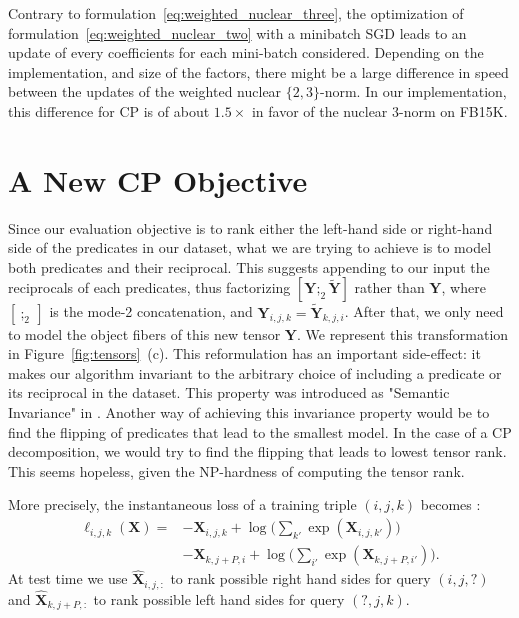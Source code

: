 \documentclass{article}
\newcommand{\tensor}[1]{{\bm #1}}
\newcommand{\CP}{{CP}\xspace}
\newcommand{\fb}{{FB15K}\xspace}
\newcommand{\tens}[1]{\tensor{#1}}
\newcommand{\tensi}[2]{\tensor{#1}_{#2}}
\newcommand{\unkn}{X}
\newcommand{\pred}{\hat{\unkn}}
\newcommand{\loss}{\ell}
\begin{document}
Contrary to formulation~\eqref{eq:weighted_nuclear_three}, the optimization of formulation~\eqref{eq:weighted_nuclear_two} with a minibatch SGD leads to an update of every coefficients for each mini-batch considered. Depending on the implementation, and size of the factors, there might be a large difference in speed between the updates of the weighted nuclear $\{2,3\}$-norm. In our implementation, this difference for \CP is of about $1.5\times$ in favor of the nuclear $3$-norm on \fb.


\section{A New \CP Objective}
Since our evaluation objective is to rank either the left-hand side or right-hand side of the predicates in our dataset, what we are trying to achieve is to model both predicates and their reciprocal. This suggests appending to our input the reciprocals of each predicates, thus factorizing $[\tens{Y};_2 \tilde{\tens{Y}}]$ rather than $\tens{Y}$, where $[~;_2~]$ is the mode-2 concatenation, and $\tens{Y}_{i,j,k} = \tilde{\tens{Y}}_{k,j,i}$. After that, we only need to model the object fibers of this new tensor $\tens{Y}$. We represent this transformation in Figure~\ref{fig:tensors}~(c). This reformulation has an important side-effect: it makes our algorithm invariant to the arbitrary choice of including a predicate or its reciprocal in the dataset. This property was introduced as "Semantic Invariance" in \citet{bailly_semantically_2015}. 
Another way of achieving this invariance property would be to find the flipping of predicates that lead to the smallest model. In the case of a CP decomposition, we would try to find the flipping that leads to lowest tensor rank. This seems hopeless, given the NP-hardness of computing the tensor rank.

More precisely, the instantaneous loss of a training triple $(i,j,k)$ becomes :
\begin{align}
\loss_{i,j,k}(\tens{\unkn}) = &-
\tensi{\unkn}{i,j,k} + \log \big ( \sum_{k'\!} \exp (\tensi{\unkn}{i,j,k'\!}) \big ) \label{eq:inv_loss} \\
& -\tensi{\unkn}{k,j+P,i} + \log \big ( \sum_{i'\!} \exp (\tensi{\unkn}{k,j+P,i'\!}) \big ). \nonumber
\end{align}
At test time we use $\tensi{\pred}{i,j,:}$ to rank possible right hand sides for query $(i, j, ?)$ and $\tensi{\pred}{k,j+P,:}$ to rank possible left hand sides for query $(?, j, k)$.
\end{document}
